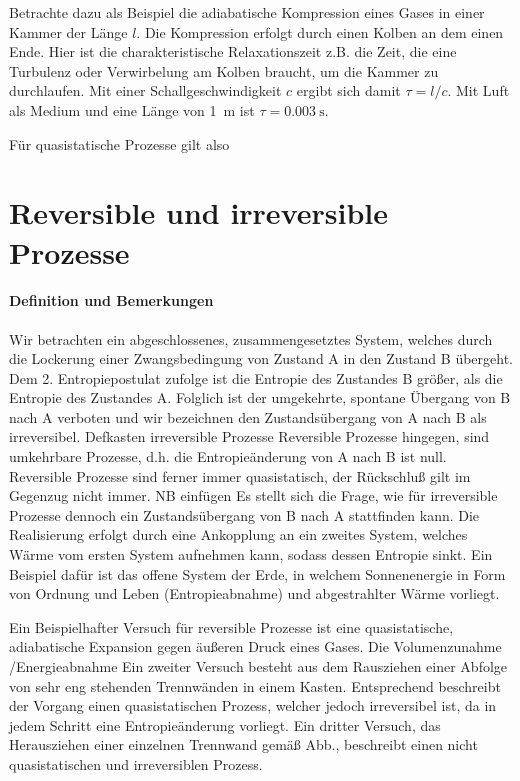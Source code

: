 Betrachte dazu als Beispiel die adiabatische Kompression eines Gases in einer Kammer der Länge $l$. Die Kompression erfolgt durch einen Kolben an dem einen Ende. Hier ist die charakteristische Relaxationszeit z.B. die Zeit, die eine Turbulenz oder Verwirbelung am Kolben braucht, um die Kammer zu durchlaufen. Mit einer Schallgeschwindigkeit $c$ ergibt sich damit $\tau =l/c$. Mit Luft als Medium und eine Länge von \SI{1}{\m} ist $\tau=\SI{0.003}{\s}$. 

Für quasistatische Prozesse gilt also 



\section{Reversible und irreversible Prozesse}


\paragraph*{Definition und Bemerkungen }
Wir betrachten ein abgeschlossenes, zusammengesetztes System, welches durch die Lockerung einer Zwangsbedingung von Zustand A
in den Zustand B übergeht. Dem 2. Entropiepostulat zufolge ist die Entropie des Zustandes B größer, als die Entropie des Zustandes A.
Folglich ist der umgekehrte, spontane Übergang von B nach A verboten und wir bezeichnen den Zustandsübergang von A nach B als irreversibel.
Defkasten irreversible Prozesse
Reversible Prozesse hingegen, sind umkehrbare Prozesse, d.h. die Entropieänderung von A nach B ist null.
Reversible Prozesse sind ferner immer quasistatisch, der Rückschluß gilt im Gegenzug nicht immer.
NB einfügen
Es stellt sich die Frage, wie für irreversible Prozesse dennoch ein Zustandsübergang von B nach A stattfinden kann.
Die Realisierung erfolgt durch eine Ankopplung an ein zweites System, welches Wärme vom ersten System aufnehmen kann, sodass dessen Entropie sinkt. 
Ein Beispiel dafür ist das offene System der Erde, in welchem Sonnenenergie in Form von Ordnung und Leben (Entropieabnahme) und abgestrahlter Wärme vorliegt.

Ein Beispielhafter Versuch für reversible Prozesse ist eine quasistatische, adiabatische Expansion gegen äußeren Druck eines Gases. Die Volumenzunahme /Energieabnahme
Ein zweiter Versuch besteht aus dem Rausziehen einer Abfolge von sehr eng stehenden Trennwänden in einem Kasten. Entsprechend beschreibt der Vorgang einen quasistatischen Prozess, welcher jedoch irreversibel ist, da in jedem Schritt eine Entropieänderung vorliegt.
Ein dritter Versuch, das Herausziehen einer einzelnen Trennwand gemäß Abb., beschreibt einen nicht quasistatischen und irreversiblen Prozess.

